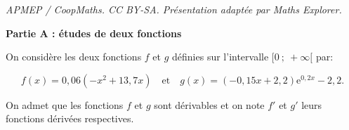 \documentclass[10pt]{article}
\begin{document}
\noindent\textit{APMEP / CoopMaths. CC BY-SA. Présentation adaptée par Maths Explorer.}\par\medskip
\begin{center}

\textbf{Partie A : études de deux fonctions}

\end{center}

On considère les deux fonctions $f$ et $g$ définies sur l'intervalle $[0~;~+\infty[$ par:

\[f(x) = 0,06\left(-x^2 +13,7x\right)\quad  \text{et}\quad  g(x) = (-0,15x + 2,2)\text{e}^{0,2x} - 2,2.\]

On admet que les fonctions $f$ et $g$ sont dérivables et on note $f'$ et $g'$ leurs fonctions dérivées respectives.

\medskip
\end{document}
